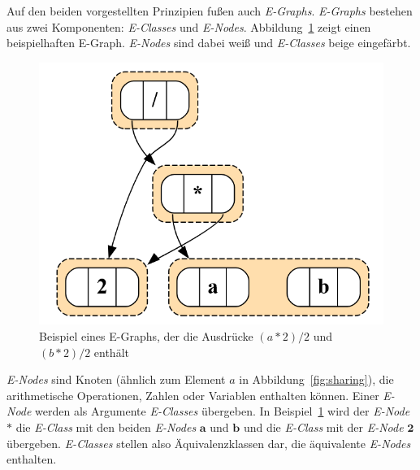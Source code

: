 Auf den beiden vorgestellten Prinzipien fußen auch \textit{E-Graphs}. \textit{E-Graphs} bestehen aus zwei Komponenten: \textit{E-Classes} und \textit{E-Nodes}. 
Abbildung~\ref{fig:egraphexp} zeigt einen beispielhaften E-Graph. \textit{E-Nodes} sind dabei weiß und \textit{E-Classes} beige eingefärbt.

\begin{figure}[H]
  \centering
  \includegraphics[scale=0.5]{../fig/egraph_exp.png}
  \caption{Beispiel eines E-Graphs, der die Ausdrücke $(a * 2) / 2$ und $(b * 2) / 2$ enthält}
  \label{fig:egraphexp}
\end{figure}

\textit{E-Nodes} sind Knoten (ähnlich zum Element $a$ in Abbildung~\ref{fig:sharing}), die arithmetische Operationen, Zahlen oder Variablen enthalten können.
Einer \textit{E-Node} werden als Argumente \textit{E-Classes} übergeben. In Beispiel~\ref{fig:egraphexp} wird der \textit{E-Node} $\mathbf{*}$ die 
\textit{E-Class} mit den beiden \textit{E-Nodes} $\mathbf{a}$ und $\mathbf{b}$ und die \textit{E-Class} mit der \textit{E-Node} $\mathbf{2}$ übergeben. 
\textit{E-Classes} stellen also Äquivalenzklassen dar, die äquivalente \textit{E-Nodes} enthalten.


